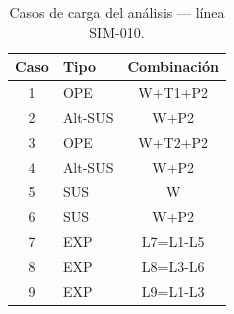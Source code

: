 \begin{table}[htbp]
  \centering
  \small
  \caption{Casos de carga del análisis — línea SIM-010.}
  \label{tab:casos}
  \begin{tabular}{clc}
    \toprule
    Caso & Tipo & Combinaci\'on \\
    \midrule
    1 & OPE & W+T1+P2 \\
    2 & Alt-SUS & W+P2 \\
    3 & OPE & W+T2+P2 \\
    4 & Alt-SUS & W+P2 \\
    5 & SUS & W \\
    6 & SUS & W+P2 \\
    7 & EXP & L7=L1-L5 \\
    8 & EXP & L8=L3-L6 \\
    9 & EXP & L9=L1-L3 \\
    \bottomrule
  \end{tabular}
\end{table}
